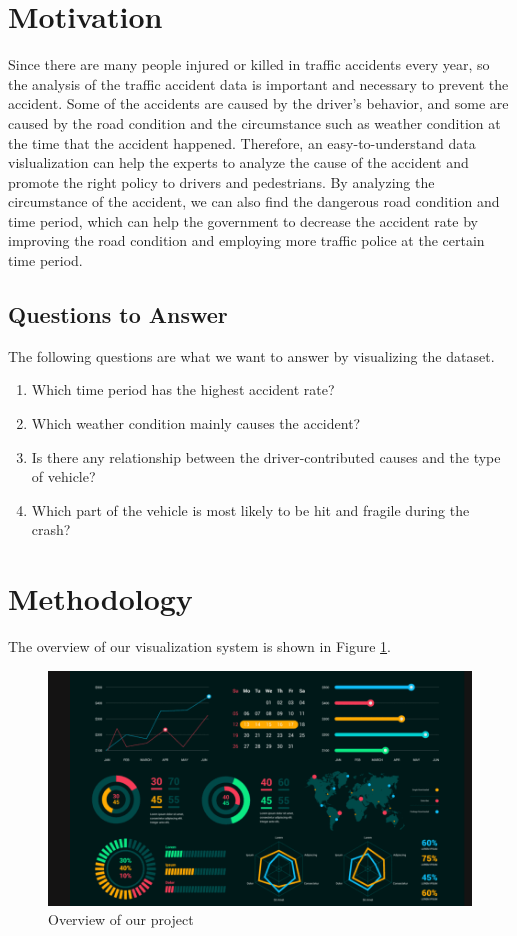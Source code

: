 \documentclass[a4paper, oneside, final, 12pt]{scrartcl} %
\begin{document}
\section{Motivation}

Since there are many people injured or killed in traffic accidents every year,
so the analysis of the traffic accident data 
is important and necessary to prevent the accident.
Some of the accidents are caused by the driver's behavior,
and some are caused by the road condition 
and the circumstance such as weather condition at the time that the accident happened.
Therefore, an easy-to-understand data vislualization 
can help the experts to analyze the cause of the accident
and promote the right policy to drivers and pedestrians.
By analyzing the circumstance of the accident,
we can also find the dangerous road condition and time period,
which can help the government to decrease the accident rate 
by improving the road condition and employing more traffic police at the certain time period.

\subsection{Questions to Answer}

The following questions are what we want to answer by visualizing the dataset.

\begin{enumerate}
  \item Which time period has the highest accident rate?
  \item Which weather condition mainly causes the accident?
  \item Is there any relationship between the 
  driver-contributed causes and the type of vehicle?
  \item Which part of the vehicle is most likely to be hit and fragile during the crash?
\end{enumerate}

\section{Methodology}

The overview of our visualization system is shown in Figure \ref{fig:overview}.

\begin{figure}[t]
  \centering
  \includegraphics[width=\textwidth]{Image/overview_sample.png}
  \caption{Overview of our project}
  \label{fig:overview}
\end{figure}
\end{document}

